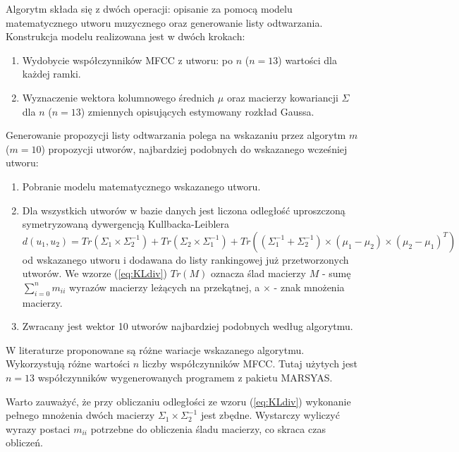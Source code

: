 Algorytm składa się z dwóch operacji: opisanie za pomocą modelu
matematycznego utworu muzycznego oraz generowanie listy odtwarzania. Konstrukcja
modelu realizowana jest w dwóch krokach:
\begin{enumerate}
 \item Wydobycie współczynników MFCC z utworu: po $n$ ($n=13$) wartości dla
każdej ramki.
 \item Wyznaczenie wektora kolumnowego średnich $\mu$ oraz
macierzy kowariancji $\Sigma$ 
dla $n$ ($n=13$) zmiennych opisujących estymowany rozkład Gaussa.
\end{enumerate}
Generowanie propozycji listy odtwarzania polega na wskazaniu przez algorytm $m$
($m=10$) propozycji utworów, najbardziej podobnych do wskazanego wcześniej
utworu:
\begin{enumerate}
 \item Pobranie modelu matematycznego wskazanego utworu.
 \item Dla wszystkich utworów w bazie danych jest liczona odległość uproszczoną
symetryzowaną dywergencją Kullbacka-Leiblera \cite{magisterska}
\begin{equation}
\label{eq:KLdiv}
 d(u_1,u_2)=Tr(\Sigma_1 \times \Sigma_{2}^{-1})+Tr(\Sigma_2 \times
\Sigma_{1}^{ -1}) + Tr((\Sigma_{1}^{-1} + \Sigma_{2}^{-1}) \times (\mu_1 -
\mu_2) \times (\mu_2 - \mu_1)^{T})
\end{equation}
od wskazanego utworu i dodawana do listy rankingowej już przetworzonych utworów.
We wzorze (\ref{eq:KLdiv}) $Tr(M)$ oznacza ślad macierzy $M$ - sumę
$\sum_{i=0}^{n} m_{ii}$ wyrazów macierzy leżących na przekątnej, a $\times $ -
znak mnożenia macierzy.
 \item Zwracany jest wektor 10 utworów najbardziej podobnych według algorytmu.
\end{enumerate}

W literaturze proponowane są różne wariacje wskazanego algorytmu.
Wykorzystują różne wartości $n$ liczby współczynników MFCC. Tutaj użytych jest
$n=13$ współczynników wygenerowanych programem z pakietu MARSYAS.

Warto zauważyć, że przy obliczaniu odległości ze wzoru (\ref{eq:KLdiv})
wykonanie
pełnego mnożenia dwóch macierzy $\Sigma_1 \times \Sigma_{2}^{-1}$ jest zbędne.
Wystarczy wyliczyć wyrazy postaci $m_{ii}$ potrzebne do obliczenia śladu
macierzy, co skraca czas obliczeń.




